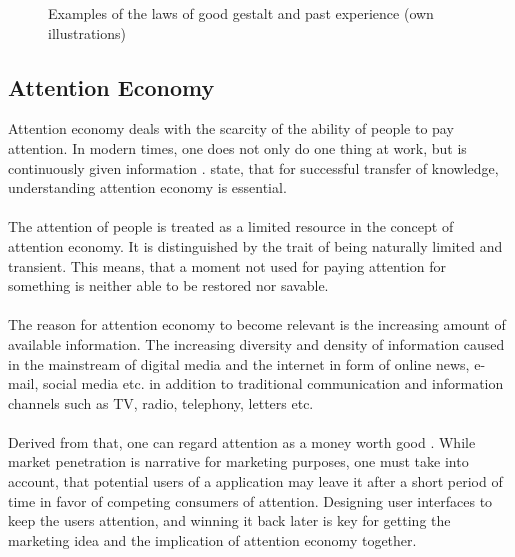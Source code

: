 \begin{enumerate}
\begin{figure}[H]
\begin{minipage}[b]{.5\linewidth}
            \label{fig:exo}
        \end{minipage}
        \caption[Laws of Good Gestalt and Past Experience]{Examples of the laws of good gestalt and past experience (own illustrations)}\label{fig:law4}
    \end{figure}
\end{enumerate}
\subsection{Attention Economy}
Attention economy deals with the scarcity of the ability of people to pay attention. In modern times, one does not only do one thing at work, but is continuously given information  \parencite[cf.][]{Davenport.2001}. \textcite{Davenport.2001} state, that for successful transfer of knowledge, understanding attention economy is essential. 
\paragraph*{} The attention of people is treated as a limited resource in the concept of attention economy. It is distinguished by the trait of being naturally limited and transient. This means, that a moment not used for paying attention for something is neither able to be restored nor savable. \parencite[cf.][]{Davenport.2001}
\paragraph*{} The reason for attention economy to become relevant is the increasing amount of available information. The increasing diversity and density of information caused in the mainstream of digital media and the internet in form of online news, e-mail, social media etc. in addition to traditional communication and information channels such as TV, radio, telephony, letters etc.
\paragraph*{} Derived from that, one can regard attention as a money worth good \parencite[cf.][]{Davenport.2001}. While market penetration is narrative for marketing purposes, one must take into account, that potential users of a application may leave it after a short period of time in favor of competing consumers of attention. Designing user interfaces to keep the users attention, and winning it back later is key for getting the marketing idea and the implication of attention economy together.
